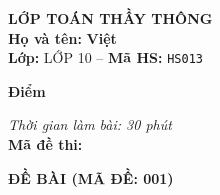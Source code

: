 \noindent
\begin{tcolorbox}[colback=white,colframe=black,arc=0mm,boxrule=0.8pt,top=4pt,bottom=4pt,left=6pt,right=6pt]
	\begin{minipage}[c]{0.44\textwidth}
		{\bfseries\large LỚP TOÁN THẦY THÔNG}\\[3pt]
		\textbf{Họ và tên:} \textbf{\large Việt}\\[3pt]
		\textbf{Lớp:} LỚP 10 \quad -- \quad \textbf{Mã HS:} \texttt{HS013}
	\end{minipage}
	\hfill
	\begin{minipage}[c]{0.22\textwidth}
		\begin{tcolorbox}[colback=white,colframe=black,arc=0mm,boxrule=0.6pt,height=1.8cm,halign=center,valign=top,top=2pt]
			{\bfseries\normalsize Điểm}
		\end{tcolorbox}
	\end{minipage}
	\hfill
	\begin{minipage}[c]{0.30\textwidth}
		\raggedleft
		\textit{Thời gian làm bài: 30 phút}\\[4pt]
		\textbf{Mã đề thi:} 
	\end{minipage}
\end{tcolorbox}
\vspace{0.25cm}

\noindent\textbf{\large ĐỀ BÀI (MÃ ĐỀ: 001)}
\vspace{0.1cm}

